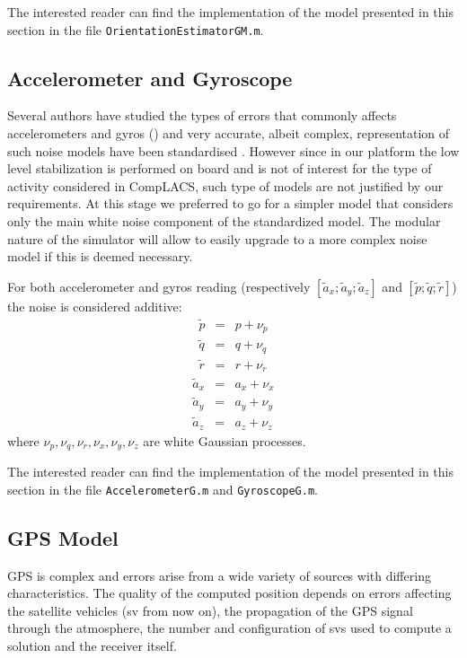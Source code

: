 \documentclass[a4paper,11pt]{report}
\begin{document}
The interested reader can find the implementation of the model presented in this section in the file \texttt{OrientationEstimatorGM.m}. 

\subsection{Accelerometer and Gyroscope}

Several authors have studied the types of errors that commonly affects accelerometers and gyros (\cite{han2011quantization}\cite{hou2003inertial}) and very accurate, albeit complex, representation of such noise models have been standardised \cite{ieee2006standard}. However since in our platform the low level stabilization is performed on board and is not of interest for the type of activity considered in CompLACS, such type of models are not justified by our requirements. 
At this stage we preferred to go for a simpler model that considers only the main white noise component of the standardized model. The modular nature of the simulator will allow to easily upgrade to a more complex noise model if this is deemed necessary.

For both accelerometer and gyros reading (respectively $[\tilde{a}_x;\tilde{a}_y;\tilde{a}_z]$ and $[\tilde{p};\tilde{q};\tilde{r}]$) the noise is considered additive:
\begin{eqnarray}
  \tilde{p} &=& p + \nu_p\\
  \tilde{q} &=& q + \nu_q\\
  \tilde{r} &=& r + \nu_r
\end{eqnarray}
\begin{eqnarray}
  \tilde{a}_x &=& a_x + \nu_x\\
  \tilde{a}_y &=& a_y + \nu_y\\
  \tilde{a}_z &=& a_z + \nu_z
\end{eqnarray}
where  $\nu_p,\nu_q,\nu_r,\nu_x,\nu_y,\nu_z$ are white Gaussian processes.

The interested reader can find the implementation of the model presented in this section in the file \texttt{AccelerometerG.m} and \texttt{GyroscopeG.m}.  

\subsection{GPS Model}

GPS is complex and errors arise from a wide variety of sources with differing characteristics. The quality of the computed position depends on errors affecting the satellite vehicles (sv from now on), the propagation of the GPS signal through the atmosphere, the number and configuration of svs used to compute a solution and the receiver itself.
\end{document}
